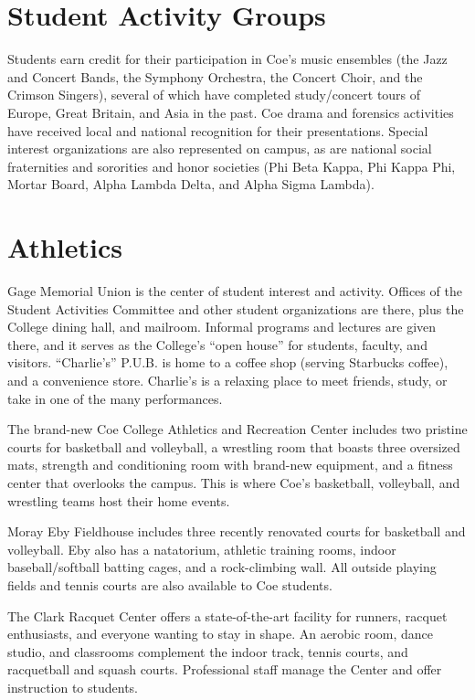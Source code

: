 \documentclass[
  letterpaper,
]{scrbook}
\begin{document}
\section{Student Activity Groups}\label{student-activity-groups}

Students earn credit for their participation in Coe's music ensembles
(the Jazz and Concert Bands, the Symphony Orchestra, the Concert Choir,
and the Crimson Singers), several of which have completed study/concert
tours of Europe, Great Britain, and Asia in the past. Coe drama and
forensics activities have received local and national recognition for
their presentations. Special interest organizations are also represented
on campus, as are national social fraternities and sororities and honor
societies (Phi Beta Kappa, Phi Kappa Phi, Mortar Board, Alpha Lambda
Delta, and Alpha Sigma Lambda).

\section{Athletics}\label{athletics}

Gage Memorial Union is the center of student interest and activity.
Offices of the Student Activities Committee and other student
organizations are there, plus the College dining hall, and mailroom.
Informal programs and lectures are given there, and it serves as the
College's ``open house'' for students, faculty, and visitors.
``Charlie's'' P.U.B. is home to a coffee shop (serving Starbucks
coffee), and a convenience store. Charlie's is a relaxing place to meet
friends, study, or take in one of the many performances.

The brand-new Coe College Athletics and Recreation Center includes two
pristine courts for basketball and volleyball, a wrestling room that
boasts three oversized mats, strength and conditioning room with
brand-new equipment, and a fitness center that overlooks the campus.
This is where Coe's basketball, volleyball, and wrestling teams host
their home events.

Moray Eby Fieldhouse includes three recently renovated courts for
basketball and volleyball. Eby also has a natatorium, athletic training
rooms, indoor baseball/softball batting cages, and a rock-climbing wall.
All outside playing fields and tennis courts are also available to Coe
students.

The Clark Racquet Center offers a state-of-the-art facility for runners,
racquet enthusiasts, and everyone wanting to stay in shape. An aerobic
room, dance studio, and classrooms complement the indoor track, tennis
courts, and racquetball and squash courts. Professional staff manage the
Center and offer instruction to students.
\end{document}
